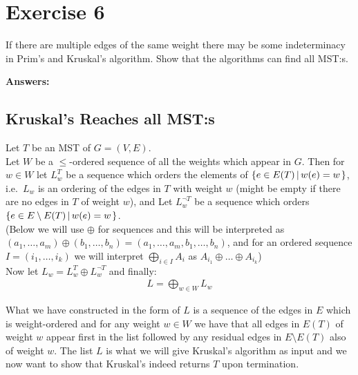 \documentclass[nobib]{tufte-handout}
\newcommand{\bigset}[3][1]{%
    \ifthenelse{1=#1}{%
        \left\{#2 \left| \, #3 \right.\right\}
    }{%
        \left\{#2\right\}
    }
}
\begin{document}
\newpage
\section{Exercise 6}
If there are multiple edges of the same weight there may be some indeterminacy in Prim's and Kruskal's algorithm. Show that the algorithms can find all MST:s. 

\textbf{Answers:} \\ 
 \subsection{Kruskal's Reaches all MST:s}
            Let $T$ be an MST of $G = (V, E)$. \\
            
            Let $W$ be a $\leq$-ordered sequence of all the weights which appear in $G$. Then for $w \in W$ let $L_w^T$ be a sequence which orders the elements of $\bigset[1]{e \in E(T)}{w(e) = w}$, i.e.\ $L_w$ is an ordering of the edges in $T$ with weight $w$ (might be empty if there are no edges in $T$ of weight $w$), and Let $L_w^{\neg T}$ be a sequence which orders $\bigset[1]{e \in E \setminus E(T)}{w(e) = w}$. \\
            
            (Below we will use $\oplus$ for sequences and this will be interpreted as $(a_1, \ldots, a_m) \oplus (b_1, \ldots, b_n) = (a_1, \ldots, a_m, b_1, \ldots, b_n)$, and for an ordered sequence $I = (i_1, \ldots, i_k)$ we will interpret $\bigoplus\limits_{i \in I} A_i$ as $A_{i_1} \oplus \ldots \oplus A_{i_k}$) \\
            
            Now let $L_w = L_w^T \oplus L_w^{\neg T}$ and finally:
%
            \begin{align*}
                L = \bigoplus_{w \in W} L_w
            \end{align*}

            What we have constructed in the form of $L$ is a sequence of the edges in $E$ which is weight-ordered and for any weight $w \in W$ we have that all edges in $E(T)$ of weight $w$ appear first in the list followed by any residual edges in $E \setminus E(T)$ also of weight $w$. The list $L$ is what we will give Kruskal's algorithm as input and we now want to show that Kruskal's indeed returns $T$ upon termination. \\
\end{document}
